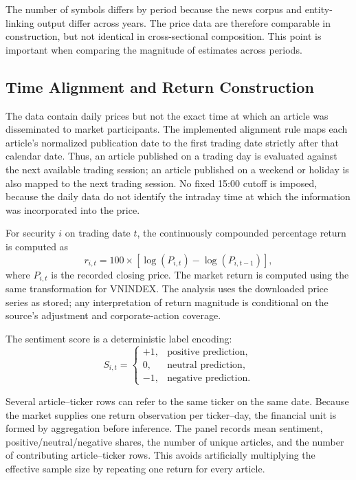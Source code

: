 \documentclass[12pt,a4paper]{article}
\begin{document}
The number of symbols differs by period because the news corpus and entity-linking output differ across years. The price data are therefore comparable in construction, but not identical in cross-sectional composition. This point is important when comparing the magnitude of estimates across periods.

\subsection{Time Alignment and Return Construction}
\label{subsec:time-alignment-multi-year}

The data contain daily prices but not the exact time at which an article was disseminated to market participants. The implemented alignment rule maps each article's normalized publication date to the first trading date strictly after that calendar date. Thus, an article published on a trading day is evaluated against the next available trading session; an article published on a weekend or holiday is also mapped to the next trading session. No fixed 15:00 cutoff is imposed, because the daily data do not identify the intraday time at which the information was incorporated into the price.

For security $i$ on trading date $t$, the continuously compounded percentage return is computed as
\begin{equation}
 r_{i,t}=100\times\left[\log(P_{i,t})-\log(P_{i,t-1})\right],
\end{equation}
where $P_{i,t}$ is the recorded closing price. The market return is computed using the same transformation for VNINDEX. The analysis uses the downloaded price series as stored; any interpretation of return magnitude is conditional on the source's adjustment and corporate-action coverage.

The sentiment score is a deterministic label encoding:
\begin{equation}
 S_{i,t}=\begin{cases}
 +1,&\text{positive prediction},\\
 0,&\text{neutral prediction},\\
 -1,&\text{negative prediction}.
 \end{cases}
\end{equation}

Several article--ticker rows can refer to the same ticker on the same date. Because the market supplies one return observation per ticker--day, the financial unit is formed by aggregation before inference. The panel records mean sentiment, positive/neutral/negative shares, the number of unique articles, and the number of contributing article--ticker rows. This avoids artificially multiplying the effective sample size by repeating one return for every article.
\end{document}
